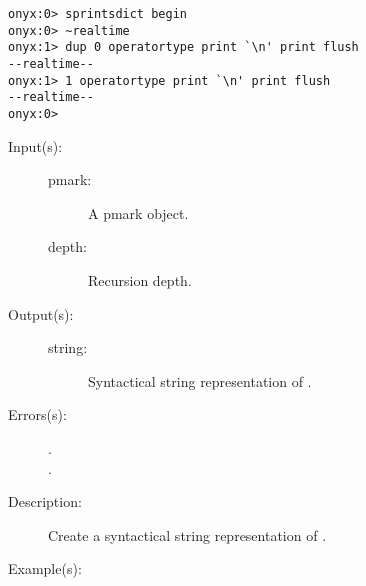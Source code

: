 \begin{description}
\begin{description}
\begin{verbatim}
onyx:0> sprintsdict begin
onyx:0> ~realtime
onyx:1> dup 0 operatortype print `\n' print flush
--realtime--
onyx:1> 1 operatortype print `\n' print flush
--realtime--
onyx:0>
		\end{verbatim}
	\end{description}
\label{sprintsdict:pmarktype}
\item[{\onyxop{pmark depth}{pmarktype}{string}}: ]
	\begin{description}\item[]
	\item[Input(s): ]
		\begin{description}\item[]
		\item[pmark: ]
			A pmark object.
		\item[depth: ]
			Recursion depth.
		\end{description}
	\item[Output(s): ]
		\begin{description}\item[]
		\item[string: ]
			Syntactical string representation of .
		\end{description}
	\item[Errors(s): ]
		\begin{description}\item[]
		\item[.]
		\item[.]
		\end{description}
	\item[Description: ]
		Create a syntactical string representation of .
	\item[Example(s): ]\begin{verbatim}


\end{verbatim}
\end{description}
\end{description}

